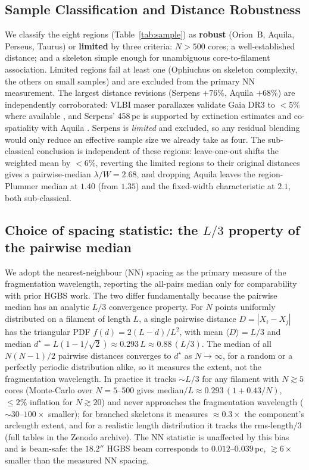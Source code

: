 \documentclass[usenatbib,twoside,twocolumn]{mnras}
\begin{document}
\subsection{Sample Classification and Distance Robustness}
\label{sec:distance_uncertainties}

We classify the eight regions (Table~\ref{tab:sample}) as \textbf{robust} (Orion~B, Aquila, Perseus, Taurus) or \textbf{limited} by three criteria: $N>500$ cores; a well-established distance; and a skeleton simple enough for unambiguous core-to-filament association. Limited regions fail at least one (Ophiuchus on skeleton complexity, the others on small samples) and are excluded from the primary NN measurement. The largest distance revisions (Serpens $+76\%$, Aquila $+68\%$) are independently corroborated: VLBI maser parallaxes validate Gaia DR3 to $<5\%$ where available \citep{Kounkel2018,Xu2021,OrtizLeon2018,OrtizLeon2017}, and Serpens' 458\,pc is supported by extinction estimates \citep[$440$--$460$\,pc;][]{Yan2022,Green2024} and co-spatiality with Aquila \citep{Zucker2020}. Serpens is \emph{limited} and excluded, so any residual blending would only reduce an effective sample size we already take as four. The sub-classical conclusion is independent of these regions: leave-one-out shifts the weighted mean by $<6\%$, reverting the limited regions to their original distances gives a pairwise-median $\lambda/W=2.68$, and dropping Aquila leaves the region-Plummer median at $1.40$ (from $1.35$) and the fixed-width characteristic at $2.1$, both sub-classical.


\subsection{Choice of spacing statistic: the $L/3$ property of the pairwise median}
\label{sec:statistics}

We adopt the nearest-neighbour (NN) spacing as the primary measure of the fragmentation wavelength, reporting the all-pairs median only for comparability with prior HGBS work. The two differ fundamentally because the pairwise median has an analytic $L/3$ convergence property. For $N$ points uniformly distributed on a filament of length $L$, a single pairwise distance $D=|X_i-X_j|$ has the triangular PDF $f(d)=2(L-d)/L^2$, with mean $\langle D\rangle=L/3$ and median $d^\star=L(1-1/\sqrt{2})\approx0.293\,L\approx0.88\,(L/3)$. The median of all $N(N-1)/2$ pairwise distances converges to $d^\star$ as $N\to\infty$, for a random or a perfectly periodic distribution alike, so it measures the extent, not the fragmentation wavelength. In practice it tracks $\sim L/3$ for any filament with $N\gtrsim5$ cores (Monte-Carlo over $N=5$--$500$ gives median$/L\approx0.293\,(1+0.43/N)$, $\le2\%$ inflation for $N\gtrsim20$) and never approaches the fragmentation wavelength ($\sim30$--$100\times$ smaller); for branched skeletons it measures $\approx0.3\times$ the component's arclength extent, and for a realistic length distribution it tracks the rms-length$/3$ (full tables in the Zenodo archive). The NN statistic is unaffected by this bias and is beam-safe: the $18.2''$ HGBS beam corresponds to $0.012$--$0.039$\,pc, $\gtrsim6\times$ smaller than the measured NN spacing.
\end{document}
